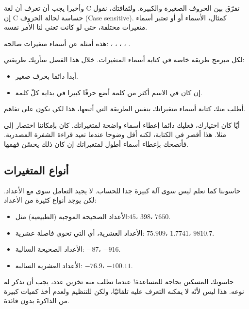وأخيرا يجب أن تعرف أن لغة
\textenglish{C}
 تفرّق بين الحروف الصغيرة والكبيرة. ولثقافتك، نقول إن
\textenglish{C}
 حساسة لحالة الحروف
(\textenglish{Case sensitive}).
كمثال، الأسماء
 أو
 أو
تعتبر أسماء متغيرات مختلفة، حتى لو كانت تعني لنا الأمر نفسه.

هذه أمثلة عن أسماء متغيرات صالحة:
،
،
،
،
.

لكل مبرمج طريقة خاصة في كتابة أسماء المتغيرات. خلال هذا الفصل سأريك طريقتي:

\begin{itemize}
  \item أبدأ دائما بحرف صغير.
  \item إن كان في الاسم أكثر من كلمة أضع حرفًا كبيرا في بداية كلّ كلمة.
\end{itemize}

أطلب منك كتابة أسماء متغيراتك بنفس الطريقة التي أتبعها، هذا لكي نكون على تفاهم.

\begin{critical}
  أيّا كان اختيارك، فعليك دائما إعطاء أسماء واضحة لمتغيراتك. كان بإمكاننا اختصار
إلى
مثلا. هذا أقصر في الكتابة، لكنه أقل وضوحا عندما تعيد قراءة الشفرة المصدرية. فأنصحك بإعطاء أسماء أطول لمتغيراتك إن كان ذلك يحسّن فهمها.
\end{critical}

\subsection{أنواع المتغيرات}

حاسوبنا كما نعلم ليس سوى آلة كبيرة جدا للحساب. لا يجيد التعامل سوى مع الأعداد. لكن يوجد أنواع كثيرة من الأعداد:

\begin{itemize}
  \item الأعداد الصحيحة الموجبة (الطبيعية) مثل:$ 45 $، $ 398 $، $ 7650 $.
  \item الأعداد العشرية، أي التي تحوي فاصلة عشرية: $ 75.909 $، $ 1.7741 $، $ 9810.7 $.
  \item الأعداد الصحيحة السالبة: $ -87 $، $ -916 $.
  \item الأعداد العشرية السالبة: $ -76.9 $، $ -100.11 $.
\end{itemize}

حاسوبك المسكين بحاجة للمساعدة! عندما تطلب منه تخزين عدد، يجب أن تذكر له نوعه. هذا ليس لأنّه لا يمكنه التعرف عليه تلقائيّا، ولكن للتنظيم ولعدم أخذ كميات كبيرة من الذاكرة بدون فائدة.

